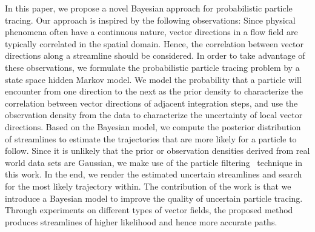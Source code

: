 \documentclass{vgtc}                          %
\begin{document}
In this paper, we propose a novel Bayesian approach for probabilistic particle tracing. Our approach is inspired by the following observations: Since physical phenomena often have a continuous nature, vector directions in a flow field are typically correlated in the spatial domain. Hence, the correlation between vector directions along a streamline should be considered. In order to take advantage of these observations, we formulate the probabilistic particle tracing problem by a state space hidden Markov model. We model the probability that a particle will encounter from one direction to the next as the prior density to characterize the correlation between vector directions of adjacent integration steps, and use the observation density from the data to characterize the uncertainty of local vector directions. Based on the Bayesian model, we compute the posterior distribution of streamlines to estimate the trajectories that are more likely for a particle to follow. Since it is unlikely that the prior or observation densities derived from real world data sets are Gaussian, we make use of the particle filtering~\cite{doucet2001sequential} technique in this work. In the end, we render the estimated uncertain streamlines and search for the most likely trajectory within. The contribution of the work is that we introduce a Bayesian model to improve the quality of uncertain particle tracing. Through experiments on different types of vector fields, the proposed method produces streamlines of higher likelihood and hence more accurate paths.













\end{document}
